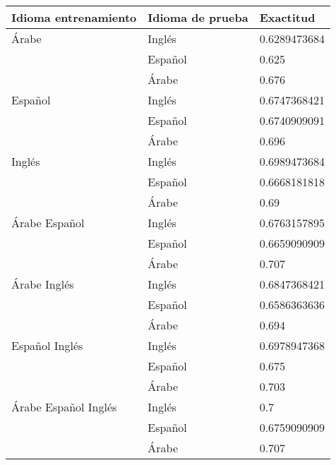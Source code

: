 \documentclass[runningheads]{llncs}
\begin{document}
\begin{table}[]
\centering
\begin{tabular}{|l|l|l|}
\hline
Idioma entrenamiento & Idioma de prueba & Exactitud    \\ \hline
Árabe                & Inglés           & 0.6289473684 \\ \cline{2-3} 
                     & Español          & 0.625        \\ \cline{2-3} 
                     & Árabe            & 0.676        \\ \hline
Español              & Inglés           & 0.6747368421 \\ \cline{2-3} 
                     & Español          & 0.6740909091 \\ \cline{2-3} 
                     & Árabe            & 0.696        \\ \hline
Inglés               & Inglés           & 0.6989473684 \\ \cline{2-3} 
                     & Español          & 0.6668181818 \\ \cline{2-3} 
                     & Árabe            & 0.69         \\ \hline
Árabe Español        & Inglés           & 0.6763157895 \\ \cline{2-3} 
                     & Español          & 0.6659090909 \\ \cline{2-3} 
                     & Árabe            & 0.707        \\ \hline
Árabe Inglés         & Inglés           & 0.6847368421 \\ \cline{2-3} 
                     & Español          & 0.6586363636 \\ \cline{2-3} 
                     & Árabe            & 0.694        \\ \hline
Español Inglés       & Inglés           & 0.6978947368 \\ \cline{2-3} 
                     & Español          & 0.675        \\ \cline{2-3} 
                     & Árabe            & 0.703        \\ \hline
Árabe Español Inglés & Inglés           & 0.7          \\ \cline{2-3} 
                     & Español          & 0.6759090909 \\ \cline{2-3} 
                     & Árabe            & 0.707        \\ \hline
\end{tabular}
\end{table}
\end{document}

